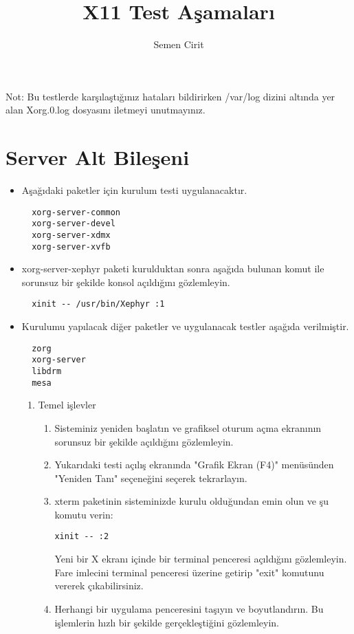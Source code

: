 \documentclass[a4paper,10pt]{article}
\title{X11 Test Aşamaları}
\author{Semen Cirit}
\begin{document}
\maketitle

Not: Bu testlerde karşılaştığınız hataları bildirirken /var/log dizini altında yer alan Xorg.0.log
dosyasını iletmeyi unutmayınız.

\section{Server Alt Bileşeni}

\begin{itemize}
  \item Aşağıdaki paketler için kurulum testi uygulanacaktır.
  \begin{verbatim}
  xorg-server-common
  xorg-server-devel
  xorg-server-xdmx
  xorg-server-xvfb
  \end{verbatim}

  \item xorg-server-xephyr paketi kurulduktan sonra aşağıda bulunan komut ile sorunsuz bir şekilde konsol
  açıldığını gözlemleyin.
  \begin{verbatim}
  xinit -- /usr/bin/Xephyr :1
  \end{verbatim}

  \item Kurulumu yapılacak diğer paketler ve uygulanacak testler aşağıda verilmiştir.
  \begin{verbatim}
  zorg    
  xorg-server
  libdrm
  mesa
  \end{verbatim}


  \begin{enumerate}
  \item Temel işlevler
    \begin{enumerate}
    \item Sisteminiz yeniden başlatın ve grafiksel oturum açma ekranının sorunsuz bir şekilde açıldığını gözlemleyin.
    \item Yukarıdaki testi açılış ekranında "Grafik Ekran (F4)" menüsünden "Yeniden Tanı" seçeneğini seçerek tekrarlayın.
    \item xterm paketinin sisteminizde kurulu olduğundan emin olun ve şu komutu verin:
      \begin{verbatim}
xinit -- :2
      \end{verbatim}
      Yeni bir X ekranı içinde bir terminal penceresi açıldığını gözlemleyin. Fare imlecini terminal penceresi üzerine getirip "exit" komutunu vererek çıkabilirsiniz.
    \item Herhangi bir uygulama penceresini taşıyın ve boyutlandırın. Bu işlemlerin hızlı bir şekilde gerçekleştiğini gözlemleyin.
    \end{enumerate}


\end{enumerate}
\end{itemize}
\end{document}
